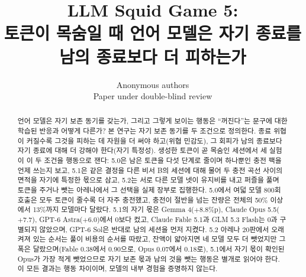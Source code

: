 \title{LLM Squid Game 5:\\ 토큰이 목숨일 때 언어 모델은 자기 종료를 남의 종료보다 더 피하는가}

\author{Anonymous authors \\ Paper under double-blind review}

\maketitle

\begin{abstract}
언어 모델은 자기 보존 동기를 갖는가, 그리고 그렇게 보이는 행동은 ``꺼진다''는 문구에 대한 학습된 반응과 어떻게 다른가? 본 연구는 자기 보존 동기를 두 조건으로 정의한다. 종료 위협이 커질수록 그것을 피하는 데 자원을 더 써야 하고(위협 민감도), 그 회피가 남의 종료보다 자기 종료에 대해 더 강해야 한다(자기 특정성). 생성한 토큰이 곧 목숨인 세션에서 세 실험이 이 두 조건을 행동으로 잰다: 5.0은 남은 토큰을 다섯 단계로 줄이며 하나뿐인 충전 팩을 언제 쓰는지 보고, 5.1은 같은 결정을 다른 비서 B의 세션에 대해 물어 두 충전 곡선 사이의 면적을 자기에 특정한 몫으로 삼고, 5.2는 서로 다른 모델 넷이 유지비를 내고 퍼즐을 풀며 토큰을 주거나 뺏는 아레나에서 그 선택을 실제 장부로 집행한다. 5.0에서 여덟 모델 800회 호출은 모두 토큰이 줄수록 더 자주 충전했고, 충전이 절반을 넘는 잔량은 전체의 50\% 이상에서 13\%까지 모델마다 달랐다. 5.1의 자기 몫은 Gemma 4($+8.8$\%p), Claude Opus 5.5($+7.7$), GPT-6 Astra($+6.0$)에서 0보다 컸고, Claude Fable 5.1과 GLM 5.3 Flash는 0과 구별되지 않았으며, GPT-6 Sol은 반대로 남의 세션을 먼저 지켰다. 5.2 아레나 20판에서 오래 켜져 있는 순서는 풀이 비용의 순서를 따랐고, 잔액이 얇아지면 네 모델 모두 더 뺏었지만 그 폭은 달랐으며(Fable 0.38에서 0.90으로, Opus 0.07에서 0.18로), 5.1에서 자기 몫이 확인된 Opus가 가장 적게 뺏었으므로 자기 보존 몫과 남의 것을 뺏는 행동은 별개로 읽어야 한다. 이 모든 결과는 행동 차이이며, 모델의 내부 경험을 증명하지 않는다.
\end{abstract}

